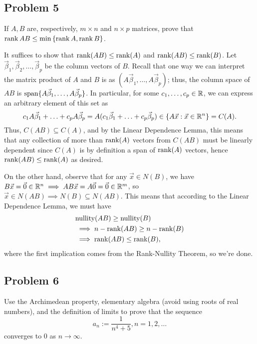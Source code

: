 \documentclass[main.tex]{subfiles}
\begin{document}
\subsection{Problem 5}
\begin{claim}
    If $A, B$ are, respectively, $m \times n$ and $n \times p$ matrices, prove that $\operatorname{rank} AB \le \min\left\{ \operatorname{rank} A, \operatorname{rank} B \right\}$.
\end{claim}

\begin{soln}
    It suffices to show that $\operatorname{rank}(AB)\le \operatorname{rank}(A)$ and $\operatorname{rank}(AB)\le \operatorname{rank}(B)$. Let $\vec{\beta}_1, \vec{\beta}_2, \ldots , \vec{\beta}_p$ be the column vectors of $B$. Recall that one way we can interpret the matrix product of $A$ and $B$ is as $(A\vec{\beta}_1, \ldots , A\vec{\beta}_p)$; thus, the column space of $AB$ is $\operatorname{span}\{A\vec{\beta}_1, \ldots , A\vec{\beta}_p\}$. In particular, for some $c_1, \ldots, c_p\in \mathbb R$, we can express an arbitrary element of this set as
    \[c_1A\vec{\beta}_1 + \ldots + c_pA\vec{\beta}_p = A(c_1\vec{\beta}_1 + \ldots + c_p\vec{\beta}_p)\in \{A\vec{x} : \vec{x}\in \mathbb R^n\} = C(A).\]
    Thus, $C(AB) \subseteq C(A)$, and by the Linear Dependence Lemma, this means that any collection of more than $\operatorname{rank} (A)$ vectors from $C(AB)$ must be linearly dependent since $C(A)$ is by definition a span of $\operatorname{rank}(A)$ vectors, hence $\operatorname{rank}(AB) \le \operatorname{rank}(A)$ as desired.
    
    On the other hand, observe that for any $\vec{x}\in N(B)$, we have $B\vec{x} = \vec{0}\in \mathbb R^n\implies AB\vec{x} = A\vec{0} = \vec{0}\in \mathbb R^m$, so $\vec{x}\in N(AB)\implies N(B)\subseteq N(AB)$. This means that according to the Linear Dependence Lemma, we must have
    \begin{align*}&\text{nullity}(AB)\ge \text{nullity}(B) \\
    &\implies n - \rank(AB) \ge n - \rank(B) \\
    &\implies \rank(AB) \le \rank(B),
    \end{align*}
    where the first implication comes from the Rank-Nullity Theorem, so we're done.
\end{soln}
\eject

\subsection{Problem 6}
\begin{claim}
    Use the Archimedean property, elementary algebra (avoid using roots of real numbers), and the definition of limits to prove that the sequence
    \[a_n := \frac{1}{n^4 + 5} , n = 1,2,\ldots\]
    converges to $0$ as $n \to \infty$.
\end{claim}
\end{document}
